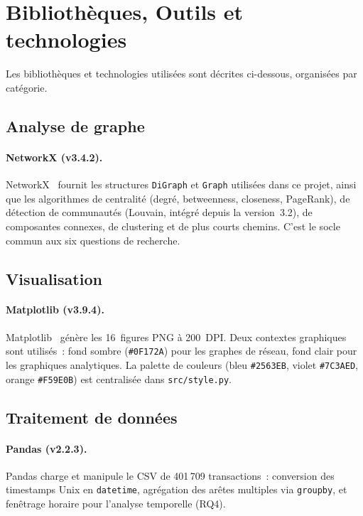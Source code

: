 
\section{Biblioth\`eques, Outils et technologies}
\label{sec:bibliotheques}

Les biblioth\`eques et technologies utilis\'ees sont d\'ecrites ci-dessous,
organis\'ees par cat\'egorie.

\subsection{Analyse de graphe}

\paragraph{NetworkX (v3.4.2).}
NetworkX~\cite{networkx_docs} fournit les structures \texttt{DiGraph} et
\texttt{Graph} utilis\'ees dans ce projet, ainsi que les algorithmes de
centralit\'e (degr\'e, betweenness, closeness, PageRank), de d\'etection de
communaut\'es (Louvain, int\'egr\'e depuis la version~3.2), de composantes
connexes, de clustering et de plus courts chemins. C'est le socle commun
aux six questions de recherche.

\subsection{Visualisation}

\paragraph{Matplotlib (v3.9.4).}
Matplotlib~\cite{matplotlib_docs} g\'en\`ere les 16~figures PNG \`a 200~DPI.
Deux contextes graphiques sont utilis\'es~: fond sombre (\texttt{\#0F172A})
pour les graphes de r\'eseau, fond clair pour les graphiques analytiques.
La palette de couleurs (bleu \texttt{\#2563EB}, violet \texttt{\#7C3AED},
orange \texttt{\#F59E0B}) est centralis\'ee dans \texttt{src/style.py}.

\subsection{Traitement de donn\'ees}

\paragraph{Pandas (v2.2.3).}
Pandas charge et manipule le CSV de 401\,709 transactions~: conversion
des timestamps Unix en \texttt{datetime}, agr\'egation des ar\^etes multiples
via \texttt{groupby}, et fen\^etrage horaire pour l'analyse temporelle (RQ4).

